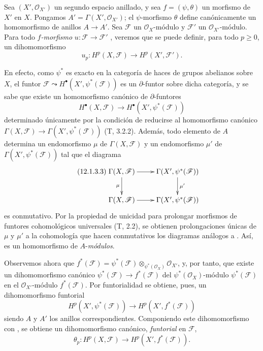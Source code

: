 \begin{env}[12.1.3]
\label{0.12.1.3}
\label{0.12.1.3-fr}
Sea $(X',\mathcal O_{X'})$ un segundo espacio anillado, y sea
$f=(\psi,\theta)$ un morfismo de $X'$ en $X$.
Pongamos $A'=\Gamma(X',\mathcal O_{X'})$; el $\psi$-morfismo $\theta$
define canónicamente un homomorfismo de anillos $A\to A'$.
Sea $\mathcal F$ un $\mathcal O_X$-módulo y $\mathcal F'$ un
$\mathcal O_{X'}$-módulo.
Para todo \emph{$f$-morfismo} $u:\mathcal F\to\mathcal F'$
, veremos que se puede definir,
para todo $p\geq0$, un dihomomorfismo
\[
\label{0.12.1.3.1-fr}
\tag{12.1.3.1}
u_p:H^p(X,\mathcal F)\longrightarrow H^p(X',\mathcal F').
\]

En efecto, como $\psi^*$ es exacto en la categoría de haces de grupos
abelianos sobre $X$, el funtor
$\mathcal F\leadsto H^\bullet(X',\psi^*(\mathcal F))$
es un $\partial$-funtor sobre dicha categoría, y se sabe que existe un
homomorfismo canónico de $\partial$-funtores
\[
\label{0.12.1.3.2-fr}
\tag{12.1.3.2}
H^\bullet(X,\mathcal F)\longrightarrow H^\bullet(X',\psi^*(\mathcal F))
\]
determinado únicamente por la condición de reducirse al homomorfismo canónico $\Gamma(X,\mathcal F)\to\Gamma(X',\psi^*(\mathcal F))$
(T, 3.2.2).
Además, todo elemento de $A$ determina un endomorfismo $\mu$ de
$\Gamma(X,\mathcal F)$ y un endomorfismo $\mu'$ de
$\Gamma(X',\psi^*(\mathcal F))$ tal que el diagrama
\[
\label{0.12.1.3.3-fr}
\tag{12.1.3.3}
\xymatrix{
\Gamma(X,\mathcal F)\ar[r]\ar[d]_\mu
&\Gamma(X',\psi^*(\mathcal F))\ar[d]^{\mu'}\\
\Gamma(X,\mathcal F)\ar[r]
&\Gamma(X',\psi^*(\mathcal F))
}
\]
es conmutativo.
Por la propiedad de unicidad para prolongar morfismos de funtores
cohomológicos universales (T, 2.2), se obtienen prolongaciones únicas de
$\mu$ y $\mu'$ a la cohomología que hacen conmutativos los diagramas
análogos a .
Así,  es un homomorfismo de $A$-\emph{módulos}.

Observemos ahora que
$f^*(\mathcal F)=\psi^*(\mathcal F)
\otimes_{\psi^*(\mathcal O_X)}\mathcal O_{X'}$,
y, por tanto, que existe un dihomomorfismo canónico
$\psi^*(\mathcal F)\to f^*(\mathcal F)$
del $\psi^*(\mathcal O_X)$-módulo $\psi^*(\mathcal F)$ en el
$\mathcal O_{X'}$-módulo $f^*(\mathcal F)$.
Por funtorialidad se obtiene, pues, un dihomomorfismo funtorial
\[
\label{0.12.1.3.4-fr}
\tag{12.1.3.4}
H^p(X',\psi^*(\mathcal F))\longrightarrow H^p(X',f^*(\mathcal F))
\]
siendo $A$ y $A'$ los anillos correspondientes.
Componiendo este dihomomorfismo con , se obtiene un
dihomomorfismo canónico, \emph{funtorial} en $\mathcal F$,
\[
\label{0.12.1.3.5-fr}
\tag{12.1.3.5}
\theta_p:H^p(X,\mathcal F)\longrightarrow H^p(X',f^*(\mathcal F)).
\]


\end{env}
